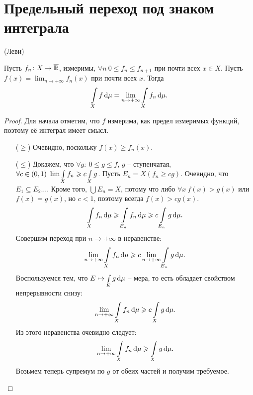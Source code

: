 \section{Предельный переход под знаком интеграла}

\begin{theorem}(Леви)

    Пусть $f_n \colon X \to \overline{\mathbb{R}}$, измеримы, $\forall n~ 0 \leqslant f_n \leqslant f_{n + 1}$
    при почти всех $x \in X$. Пусть $\displaystyle f(x) = \lim_{n \to +\infty}{f_n(x)}$ 
    при почти всех $x$. Тогда
    \[
        \int\limits_X{f \,\mathrm{d}\mu} = \lim_{n \to +\infty}{\int\limits_X{f_n \,\mathrm{d}\mu}}
    .\] 
\end{theorem}
\begin{proof}
    Для начала отметим, что $f$ измерима, как предел измеримых функций, поэтому её интеграл
    имеет смысл.
    \begin{itemize}
        \item[($\geqslant$)] Очевидно, поскольку $f(x) \geqslant f_n(x)$. 
        \item[($\leqslant$)] Докажем, что $\forall g\colon~ 0 \leqslant g \leqslant f$, 
            $g$ -- ступенчатая, $\forall c \in (0, 1)~ \lim{\int\limits_{X}{f_n}} 
            \geqslant c \int\limits_X{g}$. Пусть $E_n = X(f_n \geqslant c g)$. Очевидно, что
            $E_1 \subseteq E_2 \ldots$. Кроме того, $\bigcup{E_n} = X$, потому что
            либо $\forall x~ f(x) > g(x)$ или $f(x) = g(x)$, но $c < 1$, поэтому всегда
            $f(x) > c g(x)$.
            \[
                \int\limits_X{f_n \,\mathrm{d}\mu} \geqslant \int\limits_{E_n}{f_n \,\mathrm{d}\mu} \geqslant c \int\limits_{E_n}{g \,\mathrm{d}\mu}
            .\]
            Совершим переход при $n \to +\infty$ в неравенстве:
            \[
                \lim_{n \to +\infty}{\int\limits_{X}{f_n \,\mathrm{d}\mu}} \geqslant c \lim_{n \to +\infty}{\int\limits_{E_n}{g \,\mathrm{d}\mu}}
            .\]
            Воспользуемся тем, что $E \mapsto \int\limits_{E}{g \,\mathrm{d}\mu}$ -- мера, то есть обладает свойством
            непрерывности снизу:
            \[
                \lim_{n \to +\infty}{\int\limits_{X}{f_n \,\mathrm{d}\mu}} \geqslant c \int\limits_{X}{g \,\mathrm{d}\mu}
            .\]
            Из этого неравенства очевидно следует:
            \[
                \lim_{n \to +\infty}{\int\limits_{X}{f_n \,\mathrm{d}\mu}} \geqslant \int\limits_{X}{g \,\mathrm{d}\mu}
            .\]
            Возьмем теперь супремум по $g$ от обеих частей и получим требуемое.
    \end{itemize}
\end{proof}

